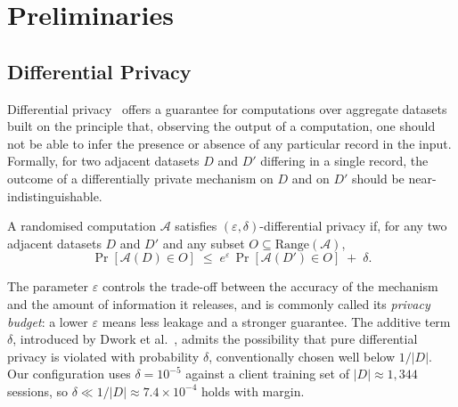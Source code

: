 
\section{Preliminaries}
\label{sec:prelim}

\subsection{Differential Privacy}
\label{sec:prelim-dp}

Differential privacy~\cite{dwork2006calibrating,dwork2006ourdata,dwork2014algorithmic}
offers a guarantee for computations over aggregate datasets built on the
principle that, observing the output of a computation, one should not be
able to infer the presence or absence of any particular record in the
input. Formally, for two adjacent datasets $D$ and $D'$ differing in a
single record, the outcome of a differentially private mechanism on $D$
and on $D'$ should be near-indistinguishable.

\begin{definition}
\label{def:dp}
A randomised computation $\mathcal{A}$ satisfies
$(\varepsilon, \delta)$-differential privacy if, for any two adjacent
datasets $D$ and $D'$ and any subset $O \subseteq \mathrm{Range}(\mathcal{A})$,
\begin{equation}
\Pr[\mathcal{A}(D) \in O] \;\le\; e^{\varepsilon}\,\Pr[\mathcal{A}(D') \in O] \;+\; \delta .
\label{eq:dp}
\end{equation}
\end{definition}

The parameter $\varepsilon$ controls the trade-off between the accuracy of
the mechanism and the amount of information it releases, and is commonly
called its \emph{privacy budget}: a lower $\varepsilon$ means less leakage
and a stronger guarantee. The additive term $\delta$, introduced by
Dwork et al.~\cite{dwork2006ourdata}, admits the possibility that pure
differential privacy is violated with probability $\delta$, conventionally
chosen well below $1/|D|$. Our configuration uses $\delta = 10^{-5}$
against a client training set of $|D| \approx 1{,}344$ sessions, so
$\delta \ll 1/|D| \approx 7.4 \times 10^{-4}$ holds with margin.

